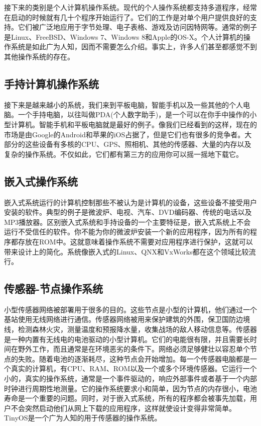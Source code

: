 	接下来的类别是个人计算机操作系统。现代的个人操作系统都支持多道程序，经常在启动的时候就有几十个程序开始运行了。它们的工作是对单个用户提供良好的支持。它们被广泛地应用于字节处理、电子表格、游戏及访问因特网等。通常的例子是Linux、FreeBSD、Windows 7、Windows 8和Apple的OS-X。个人计算机的操作系统是如此广为人知，因而不需要怎么介绍。事实上，许多人们甚至都感觉不到其他操作系统的存在。

	\subsection{手持计算机操作系统}
	
	接下来是越来越小的系统，我们来到平板电脑，智能手机以及一些其他的个人电脑。一个手持电脑，以往叫做PDA(个人数字助手)，是一个可以在你手中操作的小型计算机。智能手机和平板电脑就是最好的例子。像我们已经看到的这样，现在的市场是由Google的Android和苹果的iOS占据了，但是它们也有很多的竞争者。大部分的这些设备有多核的CPU、GPS、照相机、其他的传感器、大量的内存以及复杂的操作系统。不仅如此，它们都有第三方的应用你可以摇一摇地下载它。	
	
	\subsection{嵌入式操作系统}
	
	嵌入式系统运行的计算机控制那些不被认为是计算机的设备，这些设备不接受用户安装的软件。典型的例子是微波炉、电视、汽车、DVD编码器、传统的电话以及MP3播放器。区别嵌入式系统和手持设备的一个主要特征是，嵌入式系统上不会运行不受信任的软件。你不能为你的微波炉安装一个新的应用程序，因为所有的程序都存放在ROM中。这就意味着操作系统不需要对应用程序进行保护，这就可以带来设计上的简化。系统像嵌入式的Linux、QNX和VxWorks都在这个领域比较流行。
	
	\subsection{传感器-节点操作系统}
	
	小型传感器网络被部署用于很多的目的。这些节点是小型的计算机，他们通过一个基站使用无线网络进行通信。传感器网络被用来保护建筑的外围，保卫国防边境线，检测森林火灾，测量温度和预报降水量，收集战场的敌人移动信息等。传感器是一种内置有无线电的电池驱动的小型计算机。它们的电能很有限，并且需要长时间在野外工作，而且通常是在环境恶劣的条件下。网络必须足够健壮以容忍单个节点的失败。随着电池的逐渐耗尽，这种节点会开始增加。每一个传感器电脑都是一个真实的计算机，有CPU、RAM、ROM以及一个或多个环境传感器。它运行一个小的，真实的操作系统，通常是一个事件驱动的，响应外部事件或者基于一个内部时钟进行周期性地测量。它的操作系统要求小和简单，因为节点的内存很小，电池寿命是一个重要的问题。同时，对于嵌入式系统，所有的程序都会被事先加载，用户不会突然启动他们从网上下载的应用程序，这样就使设计变得非常简单。TinyOS是一个广为人知的用于传感器的操作系统。
	
